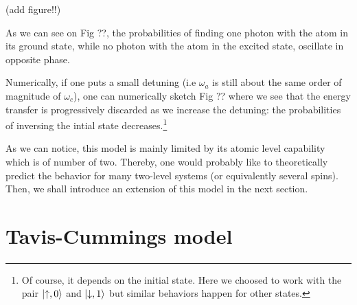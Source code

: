 \documentclass[12pt]{report}
\DeclarePairedDelimiter\ket{\lvert}{\rangle}
\begin{document}
(add figure!!)

As we can see on Fig ??, the probabilities of finding one photon with the atom in its ground state, while no photon with the atom in the excited state, oscillate in opposite phase.

Numerically, if one puts a small detuning (i.e $\omega_a$ is still about the same order of magnitude of $\omega_c$), one can numerically sketch Fig ?? where we see that the energy transfer is progressively discarded as we increase the detuning: the probabilities of inversing the intial state decreases.\footnote{Of course, it depends on the initial state. Here we choosed to work with the pair $\ket{\uparrow, 0}$ and $\ket{\downarrow, 1}$ but similar behaviors happen for other states.}

As we can notice, this model is mainly limited by its atomic level capability which is of number of two. Thereby, one would probably like to theoretically predict the behavior for many two-level systems (or equivalently several spins). Then, we shall introduce an extension of this model in the next section.

\section{Tavis-Cummings model}
\paragraph{}
\end{document}
